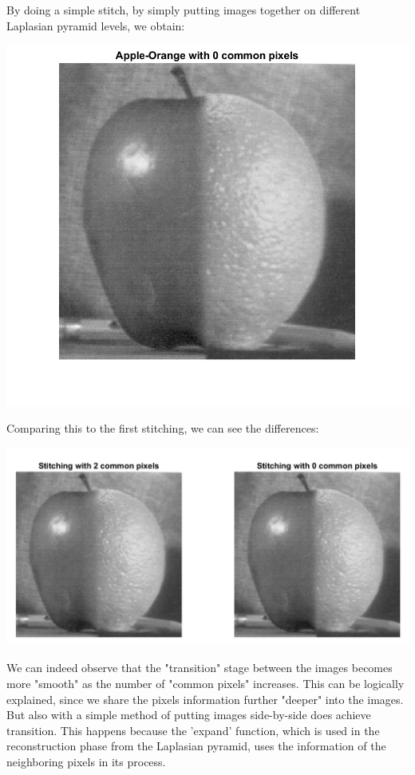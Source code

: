 \documentclass[a4paper]{iacas}
\begin{document}
\subsubsection{}
By doing a simple stitch, by simply putting images together on different Laplasian pyramid levels, we obtain:

\vskip 0.1in
\begin{minipage}{1\textwidth}
\centering
	\includegraphics[scale=0.9]{../imgs/imgs_q5/q5_apple_orange_lapl_2.png}
\end{minipage}
\vskip 0.1in

Comparing this to the first stitching, we can see the differences:
\vskip 0.1in
\begin{minipage}{1\textwidth}
\centering
	\includegraphics[scale=0.9]{../imgs/imgs_q5/q5_apple_orange_comp.png}
\end{minipage}
\vskip 0.1in

We can indeed observe that the "transition" stage between the images becomes more "smooth" as the number of "common pixels" increases. This can be logically explained, since we share the pixels information further "deeper" into the images. But also with a simple method of putting images side-by-side does achieve transition. This happens because the 'expand' function, which is used in the reconstruction phase from the Laplasian pyramid, uses the information of the neighboring pixels in its process.
\end{document}
